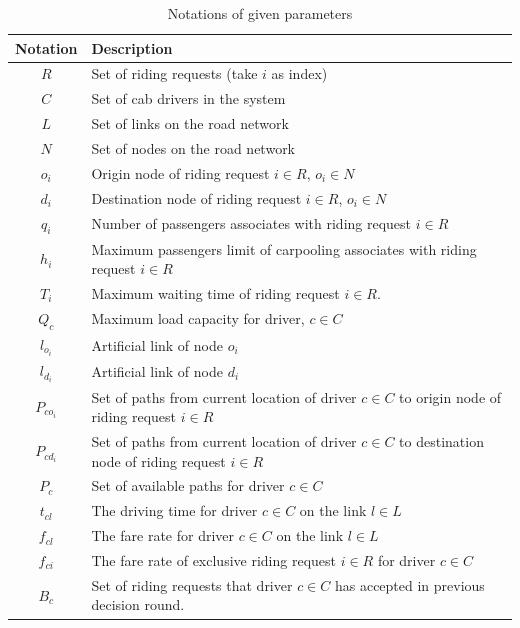 \renewcommand\arraystretch{1.5}
\par
\begin{table}[ht]
  \centering
  \caption{Notations of given parameters}
  \begin{tabularx}{\textwidth}{cX}
  \toprule
  Notation & Description \\
  \midrule
    $R$ & Set of riding requests (take $i$ as index) \\
    $C$ & Set of cab drivers in the system \\
    $L$ & Set of links on the road network \\
    $N$ & Set of nodes on the road network \\
    $o_i$ & Origin node of riding request $i \in R$, $o_i \in N$ \\
    $d_i$ & Destination node of riding request $i \in R$, $o_i \in N$ \\
    $q_i$ & Number of passengers associates with riding request $i \in R$ \\
    $h_i$ & Maximum passengers limit of carpooling associates with riding request $i \in R$ \\
    $T_i$ & Maximum waiting time of riding request $i \in R$. \\
    $Q_c$ & Maximum load capacity for driver, $c \in C$ \\
    $l_{o_i}$ & Artificial link of node $o_i$ \\
    $l_{d_i}$ & Artificial link of node $d_i$ \\
    $P_{co_i}$ & Set of paths from current location of driver $c \in C$ to origin node of riding request $i \in R$ \\
    $P_{cd_i}$ & Set of paths from current location of driver $c \in C$ to destination node of riding request $i \in R$ \\
    $P_c$ & Set of available paths for driver $c \in C$  \\
    $t_{cl}$ & The driving time for driver $c \in C$ on the link $l \in L$ \\
    $f_{cl}$ & The fare rate for driver $c \in C$ on the link $l \in L$ \\
    $f_{ci}$ & The fare rate of exclusive riding request $i \in R$ for driver $c \in C$ \\
    $B_c$ & Set of riding requests that driver $c \in C$ has accepted in previous decision round. \\
  \bottomrule
  \end{tabularx}
\end{table}  
\par

